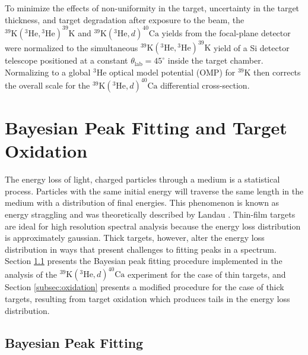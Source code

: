 To minimize the effects of non-uniformity in the target, uncertainty in the target thickness, and target degradation after exposure to the beam, the $^{39}\mathrm{K}(^{3}\mathrm{He}, {}^{3}\mathrm{He})^{39}\mathrm{K}$ and $^{39}\mathrm{K}(^{3}\mathrm{He}, d)^{40}\mathrm{Ca}$ yields from the focal-plane detector were normalized to the simultaneous $^{39}\mathrm{K}(^{3}\mathrm{He}, {}^{3}\mathrm{He})^{39}\mathrm{K}$ yield of a Si detector telescope positioned at a constant $\theta_{\mathrm{lab}} = 45^{\circ}$ inside the target chamber. Normalizing to a global $^{3}\mathrm{He}$ optical model potential (OMP) for $^{39}\mathrm{K}$ then corrects the overall scale for the $^{39}\mathrm{K}(^{3}\mathrm{He}, d)^{40}\mathrm{Ca}$ differential cross-section.

\section{Bayesian Peak Fitting and Target Oxidation} \label{sec:peak_fitting}

The energy loss of light, charged particles through a medium is a statistical process. Particles with the same initial energy will traverse the same length in the medium with a distribution of final energies. This phenomenon is known as energy straggling and was theoretically described by Landau \cite{Landau}. Thin-film targets are ideal for high resolution spectral analysis because the energy loss distribution is approximately gaussian. Thick targets, however, alter the energy loss distribution in ways that present challenges to fitting peaks in a spectrum. Section \ref{subsec:peak_fitting_gaus} presents the Bayesian peak fitting procedure implemented in the analysis of the $^{39}\mathrm{K}(^{3}\mathrm{He}, d)^{40}\mathrm{Ca}$ experiment for the case of thin targets, and Section \ref{subsec:oxidation} presents a modified procedure for the case of thick targets, resulting from target oxidation which produces tails in the energy loss distribution.

\subsection{Bayesian Peak Fitting} \label{subsec:peak_fitting_gaus}

